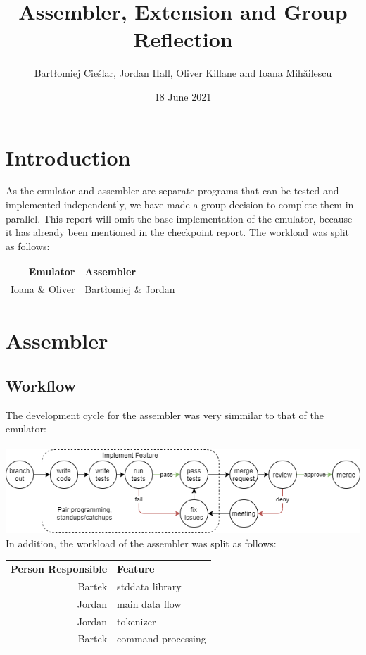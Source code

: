 \documentclass[11pt]{article}
\title{\vspace*{-1cm}Assembler, Extension and Group Reflection}
\author{\vspace*{-0.1cm}Bartłomiej Cieślar, Jordan Hall, Oliver Killane and Ioana Mihăilescu}
\date{\vspace*{-0.15cm}18 June 2021}
\begin{document}
\maketitle

\section{Introduction}
As the emulator and assembler are separate programs that can be tested and implemented independently, we have made a group decision to complete them in parallel. This report will omit the base implementation of the emulator, because it has already been mentioned in the checkpoint report. The workload was split as follows:
\begin{center}
	\begin{tabular}{ r | l }
		\textbf{Emulator} & \textbf{Assembler} \\
		Ioana \& Oliver & Bartłomiej \& Jordan
	\end{tabular}
\end{center}
\section{Assembler}
\subsection*{Workflow}
The development cycle for the assembler was very simmilar to that of the emulator:\\\\
\includegraphics[width = \textwidth]{development_cycle}
In addition, the workload of the assembler was split as follows:\\
\begin{center}
	\begin{tabular}{r|l}
		\textbf{Person Responsible} & \textbf{Feature} \\\
		Bartek & stddata library \\
		Jordan & main data flow \\
		Jordan & tokenizer \\
		Bartek & command processing \\
	\end{tabular}
\end{center}
\end{document}
